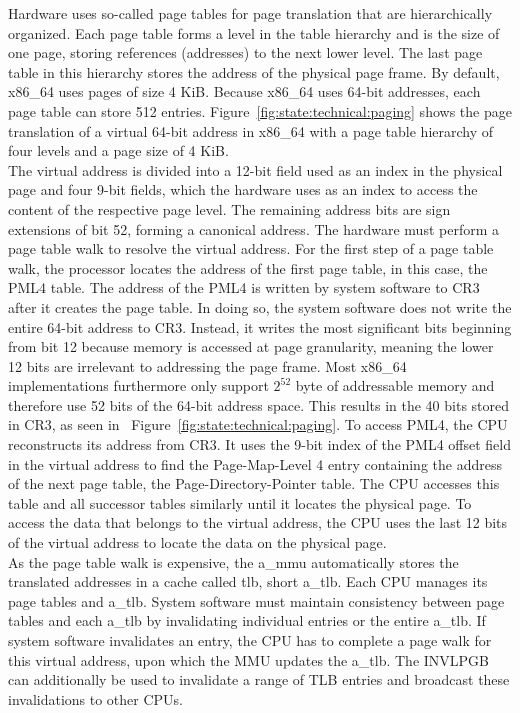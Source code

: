 Hardware uses so-called page tables for page translation that are hierarchically
organized. Each page table forms a level in the table hierarchy and is the size
of one page, storing references (addresses) to the next lower level. The last
page table in this hierarchy stores the address of the physical page frame. By
default, x86\_64 uses pages of size 4 KiB. Because x86\_64 uses 64-bit
addresses, each page table can store 512 entries.
Figure~\ref{fig:state:technical:paging} shows the page translation of a virtual
64-bit address in x86\_64 with a page table hierarchy of four levels and a page
size of 4 KiB. \\

The virtual address is divided into a 12-bit field used as an index in the
physical page and four 9-bit fields, which the hardware uses as an index to
access the content of the respective page level. The remaining address bits are
sign extensions of bit 52, forming a canonical address. The hardware must
perform a page table walk to resolve the virtual address. For the first step of
a page table walk, the processor locates the address of the first page table, in
this case, the PML4 table. The address of the PML4 is written by system software
to CR3 after it creates the page table. In doing so, the system software does
not write the entire 64-bit address to CR3. Instead, it writes the most
significant bits beginning from bit 12 because memory is accessed at page
granularity, meaning the lower 12 bits are irrelevant to addressing the page
frame. Most x86\_64 implementations furthermore only support $2^{52}$ byte of
addressable memory and therefore use 52 bits of the 64-bit address space. This
results in the 40 bits stored in CR3, as seen in
~Figure~\ref{fig:state:technical:paging}. To access PML4, the CPU reconstructs
its address from CR3. It uses the 9-bit index of the PML4 offset field in the
virtual address to find the Page-Map-Level 4 entry containing the address of the
next page table, the Page-Directory-Pointer table. The CPU accesses this table
and all successor tables similarly until it locates the physical page. To access
the data that belongs to the virtual address, the CPU uses the last 12 bits of
the virtual address to locate the data on the physical page. \\

As the page table walk is expensive, the \acrshort{a_mmu} automatically stores
the translated addresses in a cache called \gls{tlb}, short \acrshort{a_tlb}.
Each CPU manages its page tables and \acrshort{a_tlb}. System software must
maintain consistency between page tables and each \acrshort{a_tlb} by
invalidating individual entries or the entire \acrshort{a_tlb}. If system
software invalidates an entry, the CPU has to complete a page walk for this
virtual address, upon which the MMU updates the \acrshort{a_tlb}. The INVLPGB
can additionally be used to invalidate a range of TLB entries and broadcast
these invalidations to other CPUs. \\


